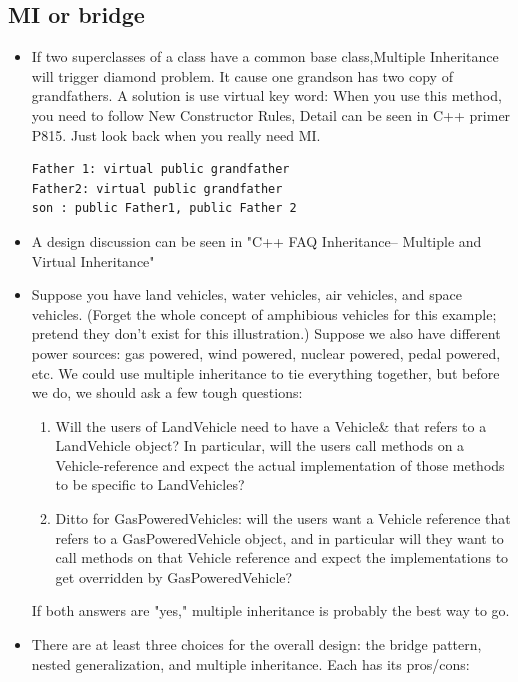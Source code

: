 \documentclass[a4paper,11pt,twoside]{book}
\begin{document}
\subsection{MI or bridge}
\begin{itemize}
	\item If two superclasses of a class have a common base class,Multiple Inheritance will trigger diamond problem. It cause one grandson has two copy of grandfathers. A solution is use virtual key word: When you use this method, you need to follow New Constructor Rules, Detail can be seen in C++ primer P815.  Just look back when you really need MI.
\begin{lstlisting}[numbers=none]
Father 1: virtual public grandfather
Father2: virtual public grandfather
son : public Father1, public Father 2
\end{lstlisting}
	
	\item A design discussion can be seen in "C++ FAQ Inheritance-- Multiple and Virtual Inheritance"
	
	\item Suppose you have land vehicles, water vehicles, air vehicles, and space vehicles. (Forget the whole concept of amphibious vehicles for this example; pretend they don't exist for this illustration.) Suppose we also have different power sources: gas powered, wind powered, nuclear powered, pedal powered, etc. We could use multiple inheritance to tie everything together, but before we do, we should ask a few tough questions:
	
	\begin{enumerate}
		\item Will the users of LandVehicle need to have a Vehicle\& that refers to a LandVehicle object? In particular, will the users call methods on a Vehicle-reference and expect the actual implementation of those methods to be specific to LandVehicles?
		
		\item Ditto for GasPoweredVehicles: will the users want a Vehicle reference that refers to a GasPoweredVehicle object, and in particular will they want to call methods on that Vehicle reference and expect the implementations to get overridden by GasPoweredVehicle?
	\end{enumerate}
	If both answers are "yes," multiple inheritance is probably the best way to go.
	
	\item There are at least three choices for the overall design: the bridge pattern, nested generalization, and multiple inheritance. Each has its pros/cons:
	

\end{itemize}
\end{document}
